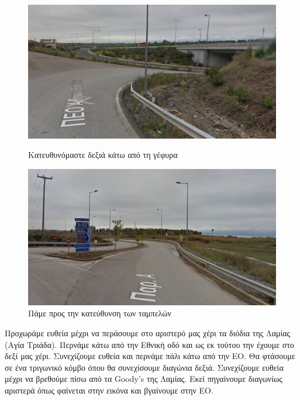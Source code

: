 \begin{figure}[H]
	\centering
		\includegraphics[width=\textwidth]{images/athina-lamia/lamia/lamia3.PNG}
			\caption{Κατευθυνόμαστε δεξιά κάτω από τη γέφυρα\newline}
	
	\centering
		\includegraphics[width=\textwidth]{images/athina-lamia/lamia/lamia4.PNG}
			\caption{Πάμε προς την κατεύθυνση των ταμπελών}
\end{figure}
Προχωράμε ευθεία μέχρι να περάσουμε στο αριστερό μας χέρι τα διόδια της Λαμίας (Αγία Τριάδα). Περνάμε κάτω από την Εθνική οδό και ως εκ τούτου την έχουμε στο δεξί μας χέρι. Συνεχίζουμε ευθεία και περνάμε πάλι κάτω από την ΕΟ. Θα φτάσουμε σε ένα τριγωνικό κόμβο όπου θα συνεχίσουμε διαγώνια δεξιά. Συνεχίζουμε ευθεία μέχρι να βρεθούμε πίσω από τα Goody's της Λαμίας. Εκεί πηγαίνουμε διαγωνίως αριστερά όπως φαίνεται στην εικόνα και βγαίνουμε στην ΕΟ.
